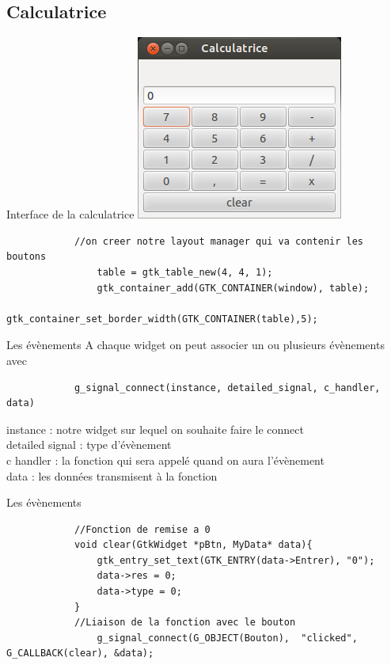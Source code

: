 \documentclass{beamer}
\begin{document}
	\subsection{Calculatrice}
	\begin{frame}[containsverbatim]{Interface de la calculatrice}
		\centering
		\includegraphics[scale=0.4]{"calc"}\\
		\begin{lstlisting}
			//on creer notre layout manager qui va contenir les boutons
				table = gtk_table_new(4, 4, 1);
				gtk_container_add(GTK_CONTAINER(window), table);
				gtk_container_set_border_width(GTK_CONTAINER(table),5);
		\end{lstlisting}
	\end{frame}
	\begin{frame}[containsverbatim]{Les évènements}
		A chaque widget on peut associer un ou plusieurs évènements avec\\
		\begin{lstlisting}
			g_signal_connect(instance, detailed_signal, c_handler, data)
		\end{lstlisting}
		instance : notre widget sur lequel on souhaite faire le connect\\
		detailed signal : type d'évènement\\
		c handler : la fonction qui sera appelé quand on aura l'évènement\\
		data : les données transmisent à la fonction\\
	\end{frame}
	\begin{frame}[containsverbatim]{Les évènements}
		\begin{lstlisting}
			//Fonction de remise a 0
			void clear(GtkWidget *pBtn, MyData* data){
				gtk_entry_set_text(GTK_ENTRY(data->Entrer), "0");
				data->res = 0;
				data->type = 0;
			}
			//Liaison de la fonction avec le bouton
				g_signal_connect(G_OBJECT(Bouton),  "clicked", G_CALLBACK(clear), &data);
		\end{lstlisting}
	\end{frame}
\end{document}
